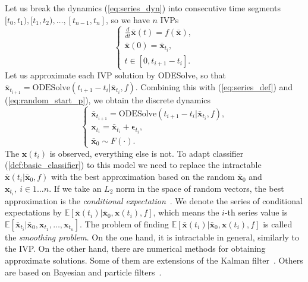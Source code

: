 \documentclass[referee, pdflatex, sn-mathphys-num]{sn-jnl}
\theoremstyle{definition}
\theoremstyle{plain}
\newcommand{\bx}{\ensuremath{\mathbf{x}}}
\newcommand{\bbx}{\ensuremath{\bar{\mathbf{x}}}}
\newcommand{\beps}{\ensuremath{\boldsymbol{\epsilon}}}
\begin{document}
	Let us break the dynamics (\ref{eq:series_dyn}) into consecutive time segments $[t_0, t_1), [t_1, t_2), \ldots, [t_{n-1}, t_n]$, so we have $n$ IVPs
	\begin{equation}
		\begin{cases}\label{eq:seg_series_dyn}
			\frac{d}{dt} \bbx(t) = f(\bbx), \\
			\bbx(0) = \bbx_{t_i}, \\
			t \in [0, t_{i+1} - t_i].
		\end{cases}
	\end{equation}
	Let us approximate each IVP solution by ODESolve, so that $\bbx_{t_{i+1}} = \text{ODESolve}(t_{i+1} - t_i | \bbx_{t_i}, f)$. Combining this with (\ref{eq:series_def}) and (\ref{eq:random_start_p}), we obtain the discrete dynamics
	\begin{equation}\label{eq:smooth}
		\begin{cases}
			\bbx_{t_{i+1}} = \text{ODESolve}(t_{i+1} - t_i | \bbx_{t_i}, f), \\
			\bx_{t_i} = \bbx_{t_i} + \beps_{t_i}, \\
			\bbx_0 \sim F(\cdot).
		\end{cases}
	\end{equation}
	The $\bx(t_i)$ is observed, everything else is not. To adapt classifier (\ref{def:basic_classifier}) to this model we need to replace the intractable $\bbx(t_i | \bbx_0, f)$ with the best approximation based on the random $\bbx_0$ and $\bx_{t_i}, \ i \in 1 \ldots n$. If we take an $L_2$ norm in the space of random vectors, the best approximation is the \emph{conditional expectation}~\cite{hogg2005introduction}. We denote the series of conditional expectations by $\mathbb{E}[\bbx(t_i) | \bbx_0, \bx(t_i), f]$, which means the $i$-th series value is $\mathbb{E}[\bbx_{t_i} | \bbx_0, \bx_{t_1}, \ldots, \bx_{t_n}]$. The problem of finding $\mathbb{E}[\bbx(t_i) | \bbx_0, \bx(t_i), f]$ is called the \emph{smoothing problem}. On the one hand, it is intractable in general, similarly to the IVP. On the other hand, there are numerical methods for obtaining approximate solutions. Some of them are extensions of the Kalman filter~\cite{ekf_book, Julier1997NewEO}. Others are based on Bayesian and particle filters~\cite{bayes_filter_smooth}.
	
\end{document}
